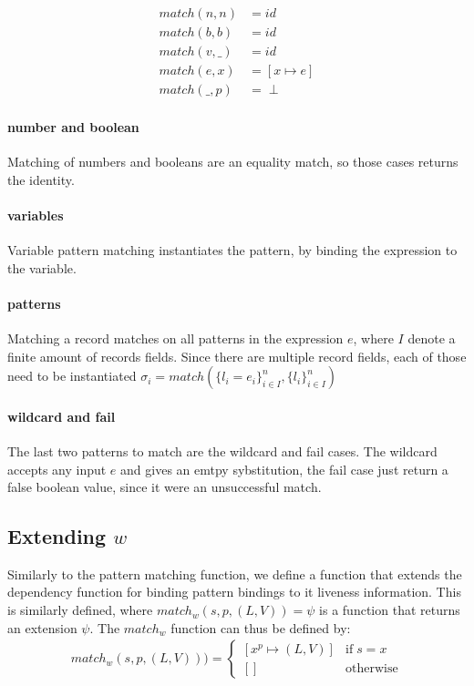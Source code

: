 \documentclass[../../master.tex]{subfiles}
\begin{document}
\begin{align*}
	match(n,n) &= id\\
	match(b,b) &= id\\
	match(v,\_) &=id\\
	match(e,x) &= [x \mapsto e]\\
	match(\_,p) &= \perp
\end{align*}

\paragraph{number and boolean}
Matching of numbers and booleans are an equality match, so those cases returns the identity.

\paragraph{variables}
Variable pattern matching instantiates the pattern, by binding the expression to the variable.

\paragraph{patterns}
Matching a record matches on all patterns in the expression $e$, where $I$ denote a finite amount of records fields.
Since there are multiple record fields, each of those need to be instantiated
$\sigma_i=match(\{l_i=e_i\}^n_{i \in I},\{l_i\}^n_{i \in I})$

\paragraph{wildcard and fail}
The last two patterns to match are the wildcard and fail cases.
The wildcard accepts any input $e$ and gives an emtpy sybstitution, the fail case just return a false boolean value, since it were an unsuccessful match.


\subsection{Extending $w$}
Similarly to the pattern matching function, we define a function that extends the dependency function for binding pattern bindings to it liveness information.
This is similarly defined, where $match_w(s,p,(L,V))=\psi$ is a function that returns an extension $\psi$.
The $match_w$ function can thus be defined by:
\begin{align}
	match_w(s,p,(L,V))) =
	\left\{\begin{matrix}
		[x^p\mapsto (L,V)] & \mbox{if}\; s=x\\ 
		[] & \mbox{otherwise}
	\end{matrix}\right.
\end{align}
\end{document}
